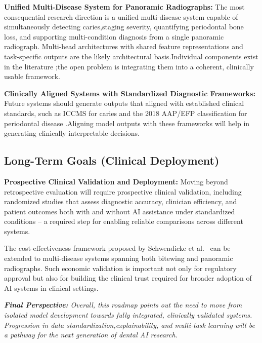 \documentclass[conference]{IEEEtran}
\begin{document}
\textbf{Unified Multi-Disease System for Panoramic Radiographs:} The most consequential research direction is a unified multi-disease system capable of simultaneously detecting caries,staging severity, quantifying periodontal bone loss, and supporting multi-condition diagnosis from a single panoramic radiograph.
Multi-head architectures with shared feature representations and task-specific outputs are the likely architectural basis.Individual components exist in the literature 
\cite{nassiri2025yolo,chen2023deep,jundaeng2025advanced,
muresanu2024automating};the open problem is integrating them into a coherent, clinically usable framework.


\textbf{Clinically Aligned Systems with Standardized Diagnostic Frameworks:}
Future systems should generate outputs that aligned with established clinical  standards, such as ICCMS for caries and the 2018 AAP/EFP classification for periodontal disease \cite{chmielewski20252018}.Aligning model outputs with these frameworks will help in generating clinically interpretable decisions.

\subsection{Long-Term Goals (Clinical Deployment)}

\textbf{Prospective Clinical Validation and Deployment:} Moving beyond retrospective evaluation will require prospective clinical validation, including randomized studies that assess diagnostic accuracy, clinician efficiency, and patient outcomes both with and without AI assistance under standardized conditions -- a required step for enabling reliable comparisons across different systems.

The cost-effectiveness framework proposed by Schwendicke et al.\
\cite{schwendicke2021cost} can be extended to multi-disease systems spanning both bitewing and panoramic radiographs. Such economic validation is important  not only for regulatory approval but also for building the clinical trust required for broader adoption of AI systems in clinical settings.


\vspace{4pt}
\noindent\textit{\textbf{Final Perspective:} Overall, this roadmap points out the need to move from  isolated model development towards fully integrated, clinically validated systems. Progression in data standardization,explainability, and multi-task learning will be a pathway for the next generation of dental AI research.
}
\end{document}
